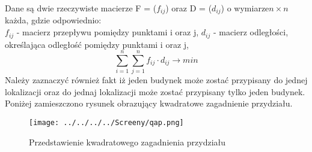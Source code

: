 Dane są dwie rzeczywiste macierze F = ($f_{ij}$) oraz D = ($d_{ij}$) o wymiarze$ n \times n $każda, gdzie odpowiednio:\\
$f_{ij}$ - macierz przepływu pomiędzy punktami i oraz j,
$d_{ij}$ - macierz odległości, określająca odległość pomiędzy punktami i oraz j,
$$
\sum_{i=1}^{n}\sum_{j=1}^{n}f_{ij} \cdot d_{ij} \longrightarrow min
$$
Należy zaznaczyć również fakt iż jeden budynek może zostać przypisany do jednej lokalizacji oraz do jednaj lokalizacji może zostać  przypisany tylko jeden budynek. Poniżej zamieszczono rysunek obrazujący kwadratowe zagadnienie przydziału.

\begin{figure}[h!]
\begin{center}
		\texttt{[image: ../../../../Screeny/qap.png]}
		\caption{Przedstawienie kwadratowego zagadnienia przydziału \cite{qap_rys}}
		\label{qap}		
\end{center}	
\end{figure}

